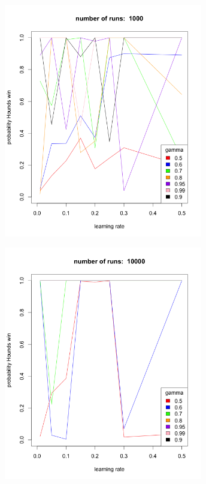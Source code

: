 \documentclass{beamer}
\begin{document}
\begin{frame}
    \centering
    \includegraphics[width=0.65\textwidth]{r1000.png}
\end{frame}

\begin{frame}
    \centering
    \includegraphics[width=0.65\textwidth]{r10000.png}
\end{frame}
\end{document}
